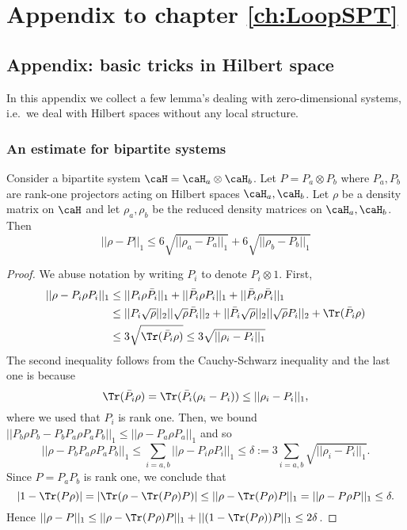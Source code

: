 \chapter{Appendix to chapter \ref{ch:LoopSPT}}\label{ch:mySecondAppendix}


\section{Appendix:  basic tricks in Hilbert space}\label{app: tricks}
In this appendix we collect a few lemma's dealing with zero-dimensional systems, i.e.\ we deal with Hilbert spaces without any local structure. 

\subsection{An estimate for bipartite systems}
\begin{lemma}\label{lem: bipartite}
	Consider a bipartite system $\caH=\caH_a\otimes\caH_b$. Let $P=P_a\otimes P_b$ where $P_a,P_b$ are rank-one projectors acting on Hilbert spaces $\caH_a,\caH_b$. Let $\rho$ be a density matrix on $\caH$ and let $\rho_a,\rho_b$ be the reduced density matrices on $\caH_a,\caH_b$.
	Then 
	$$
	||\rho-P||_1 \leq 6\sqrt{ ||\rho_a-P_a||_1}+  6\sqrt{||\rho_b-P_b||_1  }
	$$
\end{lemma}
\begin{proof}
	We abuse notation by writing $P_i$ to denote $P_i \otimes 1$. 
	First,
	\begin{align*}
		||\rho-P_i\rho P_i||_1  & \leq   ||P_i\rho\bar P_i ||_1+ ||\bar P_i\rho P_i ||_1+||\bar P_i\rho\bar P_i ||_1 \\
		& \leq  || P_i\sqrt{\rho} ||_2 || \sqrt{\rho}\bar P_i ||_2  + ||\bar P_i\sqrt{\rho} ||_2 || \sqrt{\rho} P_i ||_2  +  \Tr ( \bar P_i \rho ) \\
		&  \leq  3 \sqrt{\Tr ( \bar P_i \rho )} 
		\leq 3\sqrt{||\rho_i-P_i||_1}  
	\end{align*}
	The second inequality follows from the Cauchy-Schwarz inequality and the last one is because
	$$\Tr ( \bar P_i \rho ) = \Tr ( \bar P_i (\rho_i - P_i) )\leq ||\rho_i-P_i||_1,$$ where we used that $P_i$ is rank one. Then, we bound  $ ||P_b\rho P_b-P_b P_a\rho P_a P_b ||_1 \leq  ||\rho- P_a\rho P_a  ||_1 $ and so  
	$$ || \rho- P_b P_a\rho P_a P_b ||_1 \leq \sum_{i=a,b}   ||\rho- P_i\rho P_i  ||_1 \leq \delta := 3\sum_{i=a,b}\sqrt{||\rho_i-P_i||_1}.
	$$
	Since $P=P_aP_b$ is rank one, we conclude that
	$$
	|1-\Tr (P\rho)| = |\Tr(\rho-\Tr (P\rho)P)|\leq ||\rho-\Tr (P\rho) P ||_1 = || \rho- P\rho P ||_1 \leq  \delta.
	$$
	Hence $|| \rho- P ||_1 \leq ||\rho-\Tr (P\rho) P ||_1+||(1-\Tr (P\rho)) P ||_1 \leq 2\delta$. 
\end{proof}

